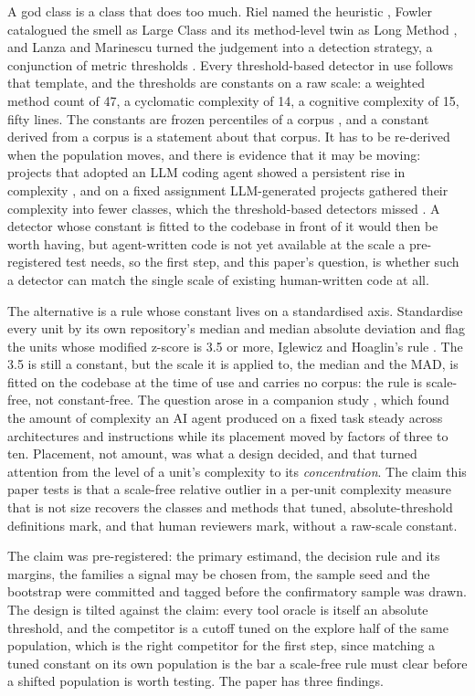 \documentclass[11pt,a4paper]{article}
\begin{document}
A god class is a class that does too much. Riel named the heuristic
\cite{riel1996}, Fowler catalogued the smell as Large Class and its
method-level twin as Long Method \cite{fowler1999}, and Lanza and Marinescu
turned the judgement into a detection strategy, a conjunction of metric
thresholds \cite{lanza2006, marinescu2004}. Every threshold-based detector in use
follows that template, and the thresholds are constants on a raw scale: a weighted method
count of 47, a cyclomatic complexity of 14, a cognitive complexity of 15,
fifty lines. The constants are frozen percentiles of a corpus
\cite{lanza2006, alves2010, ferreira2012, oliveira2014}, and a constant
derived from a corpus is a statement about that corpus. It has to be
re-derived when the population moves, and there is evidence that it may be
moving: projects that adopted an LLM coding agent showed a persistent rise in
complexity \cite{he2026cursor}, and on a fixed assignment LLM-generated
projects gathered their complexity into fewer classes, which the
threshold-based detectors missed \cite{zhang2026llm}. A detector whose
constant is fitted to the codebase in front of it would then be worth having,
but agent-written code is not yet available at the scale a pre-registered
test needs, so the first step, and this paper's question, is whether such a
detector can match the single scale of existing human-written code at all.

The alternative is a rule whose constant lives on a standardised axis.
Standardise every unit by its own repository's median and median absolute
deviation and flag the units whose modified z-score is 3.5 or more, Iglewicz
and Hoaglin's rule \cite{iglewicz1993}. The 3.5 is still a constant, but the scale it
is applied to, the median and the MAD, is fitted on the codebase at the time
of use and carries no corpus: the rule is scale-free, not constant-free. The question arose in a companion study
\cite{conserved}, which found the amount of complexity an AI agent produced on
a fixed task steady across architectures and instructions while its placement
moved by factors of three to ten. Placement, not amount, was what a design
decided, and that turned attention from the level of a unit's complexity to
its \emph{concentration}. The claim this paper tests is that a scale-free
relative outlier in a per-unit complexity measure that is not size recovers
the classes and methods that tuned, absolute-threshold definitions mark, and
that human reviewers mark, without a raw-scale constant.

The claim was pre-registered: the primary estimand, the decision rule and its
margins, the families a signal may be chosen from, the sample seed and the
bootstrap were committed and tagged before the confirmatory sample was drawn.
The design is tilted against the claim: every tool oracle is itself an
absolute threshold, and the competitor is a cutoff tuned on the explore half
of the same population, which is the right competitor for the first step,
since matching a tuned constant on its own population is the bar a scale-free
rule must clear before a shifted population is worth testing. The paper has
three findings.
\end{document}
